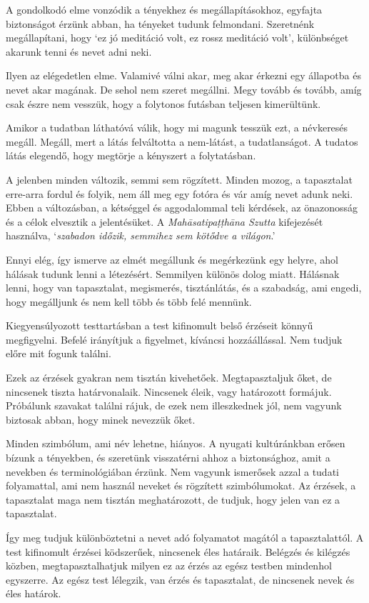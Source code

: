 A gondolkodó elme vonzódik a tényekhez és megállapításokhoz, egyfajta
biztonságot érzünk abban, ha tényeket tudunk felmondani. Szeretnénk
megállapítani, hogy `ez jó meditáció volt, ez rossz meditáció volt',
különbséget akarunk tenni és nevet adni neki.

Ilyen az elégedetlen elme. Valamivé válni akar, meg akar érkezni egy
állapotba és nevet akar magának. De sehol nem szeret megállni. Megy
tovább és tovább, amíg csak észre nem vesszük, hogy a folytonos futásban
teljesen kimerültünk.

Amikor a tudatban láthatóvá válik, hogy mi magunk tesszük ezt, a
névkeresés megáll. Megáll, mert a látás felváltotta a nem-látást, a
tudatlanságot. A tudatos látás elegendő, hogy megtörje a kényszert a
folytatásban.

A jelenben minden változik, semmi sem rögzített. Minden mozog, a
tapasztalat erre-arra fordul és folyik, nem áll meg egy fotóra és vár
amíg nevet adunk neki. Ebben a változásban, a kétséggel és aggodalommal
teli kérdések, az önazonosság és a célok elvesztik a jelentésüket. A
\emph{Mahāsatipaṭṭhāna Szutta} kifejezését használva, `\emph{szabadon
időzik, semmihez sem kötődve a világon}.'

Ennyi elég, így ismerve az elmét megállunk és megérkezünk egy helyre,
ahol hálásak tudunk lenni a létezésért. Semmilyen különös dolog miatt.
Hálásnak lenni, hogy van tapasztalat, megismerés, tisztánlátás, és a
szabadság, ami engedi, hogy megálljunk és nem kell több és több felé
mennünk.

Kiegyensúlyozott testtartásban a test kifinomult belső érzéseit könnyű
megfigyelni. Befelé irányítjuk a figyelmet, kíváncsi hozzáállással. Nem
tudjuk előre mit fogunk találni.

Ezek az érzések gyakran nem tisztán kivehetőek. Megtapasztaljuk őket, de
nincsenek tiszta határvonalaik. Nincsenek éleik, vagy határozott
formájuk. Próbálunk szavakat találni rájuk, de ezek nem illeszkednek
jól, nem vagyunk biztosak abban, hogy minek nevezzük őket.

Minden szimbólum, ami név lehetne, hiányos. A nyugati kultúránkban
erősen bízunk a tényekben, és szeretünk visszatérni ahhoz a
biztonsághoz, amit a nevekben és terminológiában érzünk. Nem vagyunk
ismerősek azzal a tudati folyamattal, ami nem használ neveket és
rögzített szimbólumokat. Az érzések, a tapasztalat maga nem tisztán
meghatározott, de tudjuk, hogy jelen van ez a tapasztalat.

Így meg tudjuk különböztetni a nevet adó folyamatot magától a
tapasztalattól. A test kifinomult érzései ködszerűek, nincsenek éles
határaik. Belégzés és kilégzés közben, megtapasztalhatjuk milyen ez az
érzés az egész testben mindenhol egyszerre. Az egész test lélegzik, van
érzés és tapasztalat, de nincsenek nevek és éles határok.

